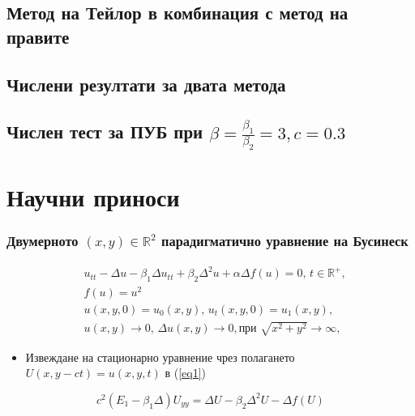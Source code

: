 \documentclass{beamer}
\newcommand{\RR}{\mathbb{R}}
\newcommand{\rf}[1]{(\ref{#1})}
\begin{document}
\begin{frame}
\subsection{Метод на Тейлор в комбинация с метод на правите}
\subsection{Числени резултати за двата метода}
\subsection{Числен тест за ПУБ при $\beta = \frac{\beta_1}{\beta_2} = 3, c=0.3$}
\section{Научни приноси}
\end{frame}

\begin{frame}
\frametitle{ Двумерното $(x,y) \in \RR^2$ парадигматично уравнение на Бусинеск }
\begin{align}
&u_{tt} - \Delta u -\beta_1  \Delta u_{tt} +\beta_2 \Delta ^2 u +\alpha \Delta f(u)=0, \, t\in\RR^+,\label{eq1}
\\
&f(u) =  u^2 \nonumber \\  \nonumber &u(x,y,0)=u_0(x,y), \, u_t(x,y,0)=u_1(x,y)  , 
\\  &u(x,y) \rightarrow 0, \,  \Delta u(x,y) \rightarrow 0 ,  \text {при } \sqrt{x^2 + y^2} \rightarrow \infty, \label{eq11} 
\end{align}
\begin{itemize}
  \item Извеждане на {\color{red}стационарно} уравнение чрез полагането $U(x,y-ct)=u(x,y,t)$ в \rf{eq1}
\end{itemize}
\color{red}
\begin{equation}
c^2 (E_1-\beta_1 \Delta) U_{yy} = \Delta U -\beta_2 \Delta^2 U - \Delta f(U)
\end{equation}

\end{frame}
\end{document}
